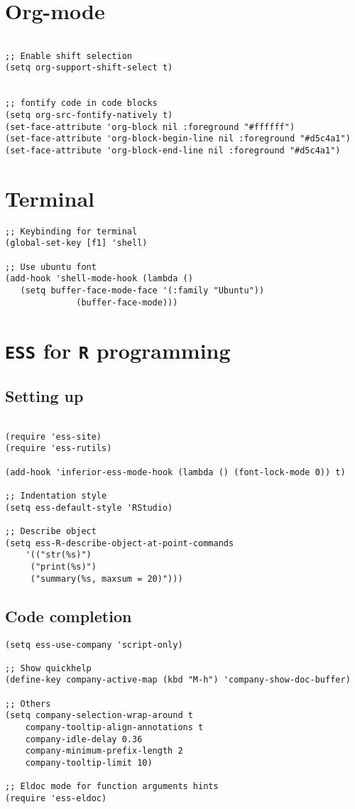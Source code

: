 \documentclass[11pt]{article}
\begin{document}
\section{Org-mode}
\label{sec:org95bdb85}
\begin{verbatim}

;; Enable shift selection
(setq org-support-shift-select t)


;; fontify code in code blocks
(setq org-src-fontify-natively t)
(set-face-attribute 'org-block nil :foreground "#ffffff")
(set-face-attribute 'org-block-begin-line nil :foreground "#d5c4a1")
(set-face-attribute 'org-block-end-line nil :foreground "#d5c4a1")

\end{verbatim}
\section{Terminal}
\label{sec:org5893ee7}
\begin{verbatim}
;; Keybinding for terminal
(global-set-key [f1] 'shell)

;; Use ubuntu font
(add-hook 'shell-mode-hook (lambda ()   
   (setq buffer-face-mode-face '(:family "Ubuntu"))
			  (buffer-face-mode)))

\end{verbatim}
\section{\texttt{ESS} for \texttt{R} programming}
\label{sec:orge2d5ca7}
\subsection{Setting up}
\label{sec:org62f68f0}
\begin{verbatim}

(require 'ess-site)
(require 'ess-rutils)

(add-hook 'inferior-ess-mode-hook (lambda () (font-lock-mode 0)) t)

;; Indentation style
(setq ess-default-style 'RStudio)

;; Describe object
(setq ess-R-describe-object-at-point-commands
    '(("str(%s)")
     ("print(%s)")
     ("summary(%s, maxsum = 20)")))

\end{verbatim}

\subsection{Code completion}
\label{sec:org9e77466}
\begin{verbatim}
(setq ess-use-company 'script-only)

;; Show quickhelp
(define-key company-active-map (kbd "M-h") 'company-show-doc-buffer)

;; Others
(setq company-selection-wrap-around t
    company-tooltip-align-annotations t
    company-idle-delay 0.36
    company-minimum-prefix-length 2
    company-tooltip-limit 10)

;; Eldoc mode for function arguments hints
(require 'ess-eldoc)


\end{verbatim}
\end{document}
